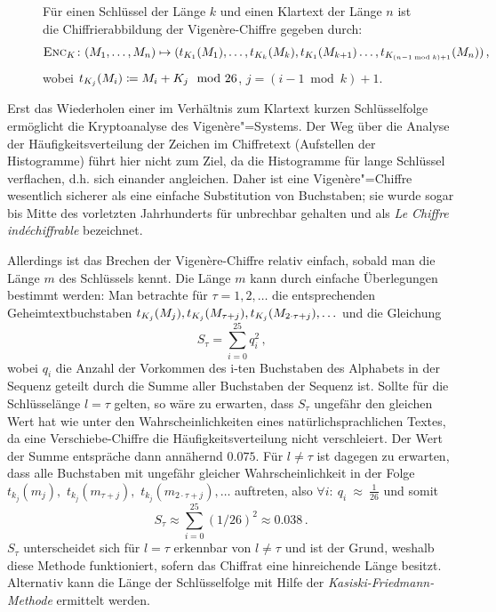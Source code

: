 \begin{figure}[h]
	Für einen Schlüssel der Länge $k$  und einen Klartext der Länge $n$ ist die Chiffrierabbildung der Vigenère-Chiffre gegeben durch:
	\begin{align*}
		\textsc{Enc}_{K}\colon (M_1,\ldots,M_{n}) \mapsto (t_{K_1}(M_1),\ldots,t_{K_{k}}(M_{k}),t_{K_1}(M_{k+1})\ldots,t_{K_{(n-1 \bmod k)+1}}(M_{n}))\, ,
	\end{align*}
	wobei $t_{K_{j}}(M_{i}) \coloneqq M_{i} + K_{j} \mod 26$, $j = (i-1 \bmod k)+1$.
\end{figure}
Erst das Wiederholen einer im Verhältnis zum Klartext kurzen Schlüsselfolge ermöglicht die Kryptoanalyse des Vigenère"=Systems.
Der Weg über die Analyse der Häufigkeitsverteilung der Zeichen im Chiffretext (Aufstellen der Histogramme) führt hier nicht zum Ziel, da die Histogramme für
lange Schlüssel verflachen, d.h. sich einander angleichen. Daher ist eine Vigenère"=Chiffre wesentlich sicherer als eine einfache Substitution von
Buchstaben; sie wurde sogar bis Mitte des vorletzten Jahrhunderts für unbrechbar gehalten und als \emph{Le Chiffre indéchiffrable} bezeichnet.

Allerdings ist das Brechen der Vigenère-Chiffre relativ einfach, sobald man die Länge $m$ des Schlüssels kennt. Die Länge $m$ kann durch einfache Überlegungen bestimmt werden: Man betrachte für $\tau = 1,2,\ldots$ die entsprechenden Geheimtextbuchstaben $t_{K_j}(M_j),t_{K_j}(M_{\tau+j}),t_{K_j}(M_{2 \cdot \tau+j}),\ldots$ und die Gleichung
\begin{equation*}
	S_{\tau}=	\sum_{i=0}^{25} q^2_i \, \text{,}
\end{equation*}
wobei $q_i$ die Anzahl der Vorkommen des i-ten Buchstaben des Alphabets in der Sequenz geteilt durch die Summe aller Buchstaben der Sequenz ist. Sollte für die
Schlüsselänge $l = \tau$ gelten, so wäre zu erwarten, dass $S_{\tau}$ ungefähr den gleichen Wert hat wie unter den Wahrscheinlichkeiten eines
natürlichsprachlichen Textes, da eine Verschiebe-Chiffre die Häufigkeitsverteilung nicht verschleiert. Der Wert der Summe entspräche dann annähernd $0.075$.
Für $l \neq \tau$ ist dagegen zu erwarten, dass alle Buchstaben mit ungefähr gleicher Wahrscheinlichkeit in der Folge $t_{k_j}(m_j),$ $t_{k_j}(m_{\tau+j}),$ $t_{k_j}(m_{2 \cdot \tau+j}),\ldots$ auftreten, also $\forall i\colon~q_i~\approx~\frac{1}{26}$ und somit
\begin{equation*}
	S_{\tau} \approx \sum_{i=0}^{25} (1/26)^2 \approx 0.038 \,\text{.}
\end{equation*}
$S_{\tau}$ unterscheidet sich für $l = \tau$ erkennbar von $l \neq \tau$ und ist der Grund, weshalb diese Methode funktioniert, sofern das Chiffrat eine hinreichende Länge besitzt. Alternativ kann die Länge der Schlüsselfolge mit Hilfe der \emph{Kasiski-Friedmann-Methode} \cite{Kasiski1863} ermittelt werden.

